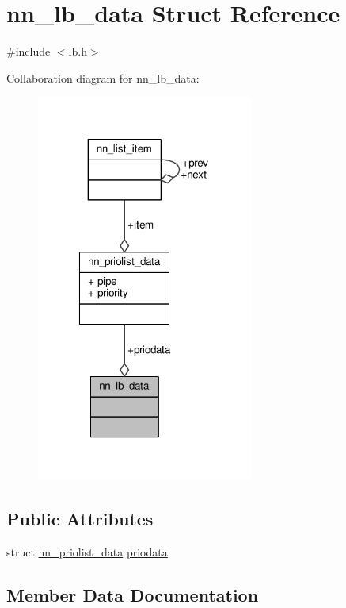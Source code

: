 \hypertarget{structnn__lb__data}{}\section{nn\+\_\+lb\+\_\+data Struct Reference}
\label{structnn__lb__data}


{\ttfamily \#include $<$lb.\+h$>$}



Collaboration diagram for nn\+\_\+lb\+\_\+data\+:\nopagebreak
\begin{figure}[H]
\begin{center}
\leavevmode
\includegraphics[width=202pt]{structnn__lb__data__coll__graph}
\end{center}
\end{figure}
\subsection*{Public Attributes}
\begin{DoxyCompactItemize}
\item 
struct \hyperlink{structnn__priolist__data}{nn\+\_\+priolist\+\_\+data} \hyperlink{structnn__lb__data_af6e25c0a43dee66626f73ae3055d4688}{priodata}
\end{DoxyCompactItemize}


\subsection{Member Data Documentation}

